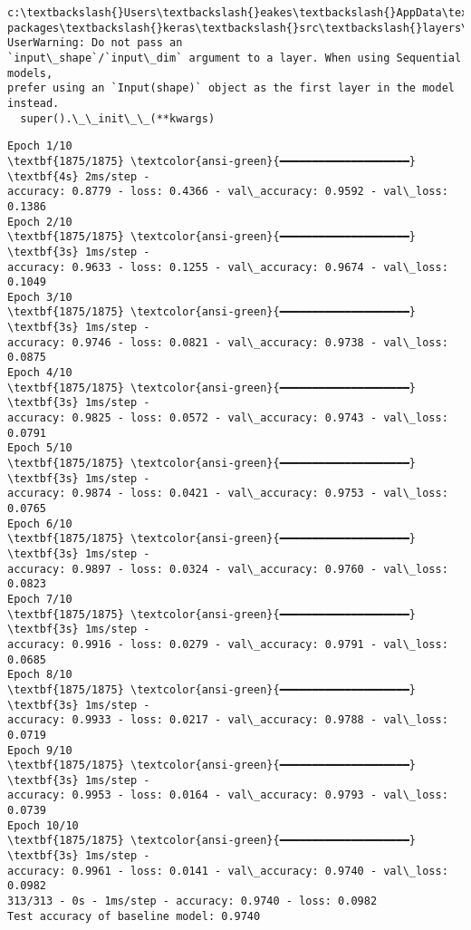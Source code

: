 \documentclass[11pt]{article}
\begin{document}
    \begin{Verbatim}[commandchars=\\\{\}]
c:\textbackslash{}Users\textbackslash{}eakes\textbackslash{}AppData\textbackslash{}Local\textbackslash{}Programs\textbackslash{}Python\textbackslash{}Python311\textbackslash{}Lib\textbackslash{}site-
packages\textbackslash{}keras\textbackslash{}src\textbackslash{}layers\textbackslash{}reshaping\textbackslash{}flatten.py:37: UserWarning: Do not pass an
`input\_shape`/`input\_dim` argument to a layer. When using Sequential models,
prefer using an `Input(shape)` object as the first layer in the model instead.
  super().\_\_init\_\_(**kwargs)
    \end{Verbatim}

    \begin{Verbatim}[commandchars=\\\{\}]
Epoch 1/10
\textbf{1875/1875} \textcolor{ansi-green}{━━━━━━━━━━━━━━━━━━━━} \textbf{4s} 2ms/step -
accuracy: 0.8779 - loss: 0.4366 - val\_accuracy: 0.9592 - val\_loss: 0.1386
Epoch 2/10
\textbf{1875/1875} \textcolor{ansi-green}{━━━━━━━━━━━━━━━━━━━━} \textbf{3s} 1ms/step -
accuracy: 0.9633 - loss: 0.1255 - val\_accuracy: 0.9674 - val\_loss: 0.1049
Epoch 3/10
\textbf{1875/1875} \textcolor{ansi-green}{━━━━━━━━━━━━━━━━━━━━} \textbf{3s} 1ms/step -
accuracy: 0.9746 - loss: 0.0821 - val\_accuracy: 0.9738 - val\_loss: 0.0875
Epoch 4/10
\textbf{1875/1875} \textcolor{ansi-green}{━━━━━━━━━━━━━━━━━━━━} \textbf{3s} 1ms/step -
accuracy: 0.9825 - loss: 0.0572 - val\_accuracy: 0.9743 - val\_loss: 0.0791
Epoch 5/10
\textbf{1875/1875} \textcolor{ansi-green}{━━━━━━━━━━━━━━━━━━━━} \textbf{3s} 1ms/step -
accuracy: 0.9874 - loss: 0.0421 - val\_accuracy: 0.9753 - val\_loss: 0.0765
Epoch 6/10
\textbf{1875/1875} \textcolor{ansi-green}{━━━━━━━━━━━━━━━━━━━━} \textbf{3s} 1ms/step -
accuracy: 0.9897 - loss: 0.0324 - val\_accuracy: 0.9760 - val\_loss: 0.0823
Epoch 7/10
\textbf{1875/1875} \textcolor{ansi-green}{━━━━━━━━━━━━━━━━━━━━} \textbf{3s} 1ms/step -
accuracy: 0.9916 - loss: 0.0279 - val\_accuracy: 0.9791 - val\_loss: 0.0685
Epoch 8/10
\textbf{1875/1875} \textcolor{ansi-green}{━━━━━━━━━━━━━━━━━━━━} \textbf{3s} 1ms/step -
accuracy: 0.9933 - loss: 0.0217 - val\_accuracy: 0.9788 - val\_loss: 0.0719
Epoch 9/10
\textbf{1875/1875} \textcolor{ansi-green}{━━━━━━━━━━━━━━━━━━━━} \textbf{3s} 1ms/step -
accuracy: 0.9953 - loss: 0.0164 - val\_accuracy: 0.9793 - val\_loss: 0.0739
Epoch 10/10
\textbf{1875/1875} \textcolor{ansi-green}{━━━━━━━━━━━━━━━━━━━━} \textbf{3s} 1ms/step -
accuracy: 0.9961 - loss: 0.0141 - val\_accuracy: 0.9740 - val\_loss: 0.0982
313/313 - 0s - 1ms/step - accuracy: 0.9740 - loss: 0.0982
Test accuracy of baseline model: 0.9740
    \end{Verbatim}
\end{document}
